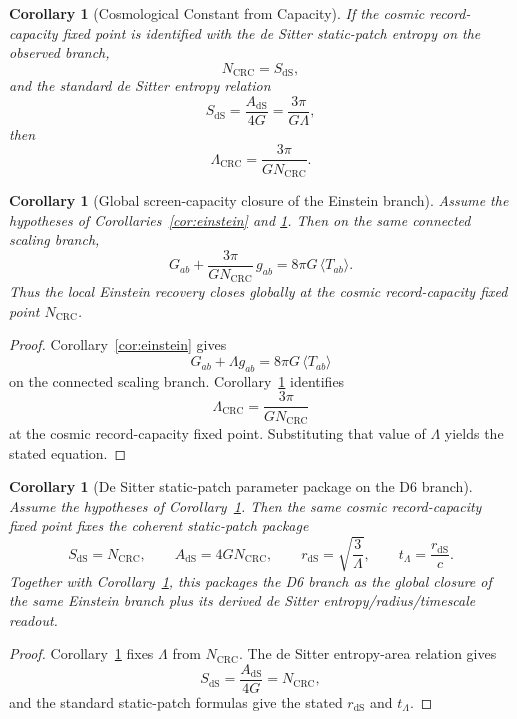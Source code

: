 \documentclass[11pt]{article}
\newtheorem{corollary}[theorem]{Corollary}
\begin{document}
\begin{corollary}[Cosmological Constant from Capacity]\label{cor:lambda}
If the cosmic record-capacity fixed point is identified with the de Sitter static-patch entropy on
the observed branch,
\[
N_{\mathrm{CRC}}=S_{\mathrm{dS}},
\]
\noindent and the standard de Sitter entropy relation
\[
S_{\mathrm{dS}}=\frac{A_{\mathrm{dS}}}{4G}=\frac{3\pi}{G\Lambda},
\]
then
\[
\Lambda_{\mathrm{CRC}}=\frac{3\pi}{G N_{\mathrm{CRC}}}.
\]
\end{corollary}

\begin{corollary}[Global screen-capacity closure of the Einstein branch]\label{cor:lambda-global}
Assume the hypotheses of Corollaries~\ref{cor:einstein} and \ref{cor:lambda}. Then on the same connected scaling branch,
\[
G_{ab}+\frac{3\pi}{G N_{\mathrm{CRC}}}\,g_{ab}=8\pi G\,\langle T_{ab}\rangle.
\]
Thus the local Einstein recovery closes globally at the cosmic record-capacity fixed point
\(N_{\mathrm{CRC}}\).
\end{corollary}

\begin{proof}
Corollary~\ref{cor:einstein} gives
\[
G_{ab}+\Lambda g_{ab}=8\pi G\,\langle T_{ab}\rangle
\]
on the connected scaling branch. Corollary~\ref{cor:lambda} identifies
\[
\Lambda_{\mathrm{CRC}}=\frac{3\pi}{G N_{\mathrm{CRC}}}
\]
at the cosmic record-capacity fixed point. Substituting that value of \(\Lambda\) yields the stated equation.
\end{proof}

\begin{corollary}[De Sitter static-patch parameter package on the D6 branch]\label{cor:lambda-parameters}
Assume the hypotheses of Corollary~\ref{cor:lambda}. Then the same cosmic record-capacity fixed point fixes the coherent static-patch package
\[
S_{\mathrm{dS}}=N_{\mathrm{CRC}},
\qquad
A_{\mathrm{dS}}=4G N_{\mathrm{CRC}},
\qquad
r_{\mathrm{dS}}=\sqrt{\frac{3}{\Lambda}},
\qquad
t_\Lambda=\frac{r_{\mathrm{dS}}}{c}.
\]
Together with Corollary~\ref{cor:lambda-global}, this packages the D6 branch as the global closure of the same Einstein branch plus its derived de Sitter entropy/radius/timescale readout.
\end{corollary}

\begin{proof}
Corollary~\ref{cor:lambda} fixes \(\Lambda\) from \(N_{\mathrm{CRC}}\). The de Sitter entropy-area relation gives
\[
S_{\mathrm{dS}}=\frac{A_{\mathrm{dS}}}{4G}=N_{\mathrm{CRC}},
\]
and the standard static-patch formulas give the stated \(r_{\mathrm{dS}}\) and \(t_\Lambda\).
\end{proof}
\end{document}
